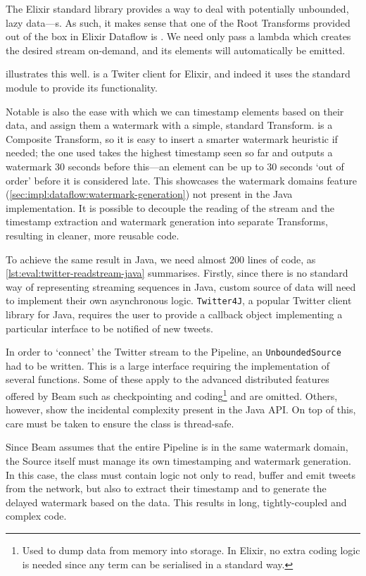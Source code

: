 The Elixir standard library provides a way to deal with potentially unbounded, lazy data---s.
As such, it makes sense that one of the Root Transforms provided out of the box in Elixir Dataflow is .
We need only pass a lambda which creates the desired stream on-demand, and its elements will automatically be emitted.

 illustrates this well.
 is a Twiter client for Elixir, and indeed it uses the standard  module to provide its functionality.

Notable is also the ease with which we can timestamp elements based on their data, and assign them a watermark with a simple, standard Transform.
 is a Composite Transform, so it is easy to insert a smarter watermark heuristic if needed; the one used takes the highest timestamp seen so far and outputs a watermark 30 seconds before this---an element can be up to 30 seconds `out of order' before it is considered late.
This showcases the watermark domains feature (\cref{sec:impl:dataflow:watermark-generation}) not present in the Java implementation.
It is possible to decouple the reading of the stream and the timestamp extraction and watermark generation into separate Transforms, resulting in cleaner, more reusable code.

To achieve the same result in Java, we need almost 200 lines of code, as \cref{lst:eval:twitter-readstream-java} summarises.
Firstly, since there is no standard way of representing streaming sequences in Java, custom source of data will need to implement their own asynchronous logic.
\texttt{Twitter4J}, a popular Twitter client library for Java, requires the user to provide a callback object implementing a particular interface to be notified of new tweets.

In order to `connect' the Twitter stream to the Pipeline, an \texttt{UnboundedSource} had to be written.
This is a large interface requiring the implementation of several functions.
Some of these apply to the advanced distributed features offered by Beam such as checkpointing and coding\footnote{
Used to dump data from memory into storage. In Elixir, no extra coding logic is needed since any term can be serialised in a standard way.
} and are omitted.
Others, however, show the incidental complexity present in the Java API.
On top of this, care must be taken to ensure the class is thread-safe.

Since Beam assumes that the entire Pipeline is in the same watermark domain, the Source itself must manage its own timestamping and watermark generation.
In this case, the class must contain logic not only to read, buffer and emit tweets from the network, but also to extract their timestamp and to generate the delayed watermark based on the data.
This results in long, tightly-coupled and complex code.

